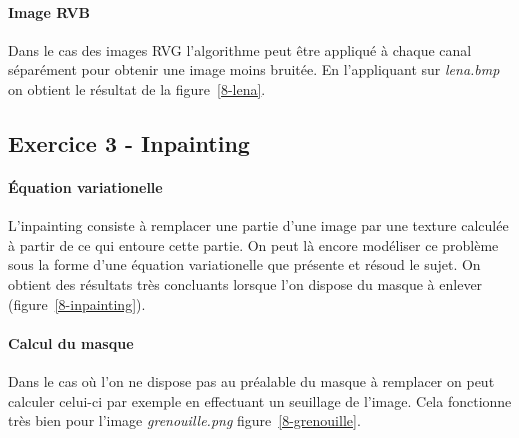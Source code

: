 \begin{figure}
\end{figure}

\paragraph{Image RVB}
Dans le cas des images RVG l'algorithme peut être appliqué à chaque canal séparément pour obtenir une image moins bruitée. En l'appliquant sur \emph{lena.bmp} on obtient le résultat de la figure~\ref{8-lena}.

\begin{figure}
\end{figure}

\subsection{Exercice 3 - Inpainting}
\paragraph{Équation variationelle}
L'inpainting consiste à remplacer une partie d'une image par une texture calculée à partir de ce qui entoure cette partie. On peut là encore modéliser ce problème sous la forme d'une équation variationelle que présente et résoud le sujet. On obtient des résultats très concluants lorsque l'on dispose du masque à enlever (figure~\ref{8-inpainting}).

\begin{figure}
\end{figure}

\paragraph{Calcul du masque}
Dans le cas où l'on ne dispose pas au préalable du masque à remplacer on peut calculer celui-ci par exemple en effectuant un seuillage de l'image. Cela fonctionne très bien pour l'image \emph{grenouille.png} figure~\ref{8-grenouille}.
